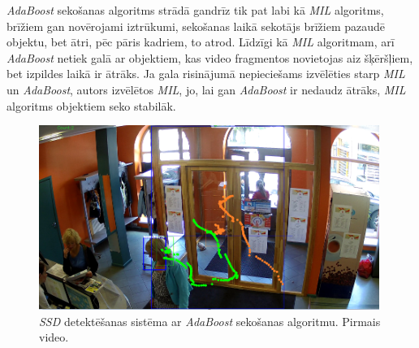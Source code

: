 \textit{AdaBoost} sekošanas algoritms strādā gandrīz tik pat labi kā \textit{MIL} algoritms, brīžiem gan novērojami iztrūkumi, sekošanas laikā sekotājs brīžiem pazaudē objektu, bet ātri, pēc pāris kadriem, to atrod. Līdzīgi kā \textit{MIL} algoritmam, arī \textit{AdaBoost} netiek galā ar objektiem, kas video fragmentos novietojas aiz šķēršļiem, bet izpildes laikā ir ātrāks. Ja gala risinājumā nepieciešams izvēlēties starp \textit{MIL} un \textit{AdaBoost}, autors izvēlētos \textit{MIL}, jo, lai gan \textit{AdaBoost} ir nedaudz ātrāks, \textit{MIL} algoritms objektiem seko stabilāk.
\begin{figure}[h]%
	\centering
	\includegraphics[height=6cm]{images/ssd7.png} %
	\caption{\textit{SSD} detektēšanas sistēma ar \textit{AdaBoost} sekošanas algoritmu. Pirmais video.}%
	\label{fig:example}%
\end{figure}
